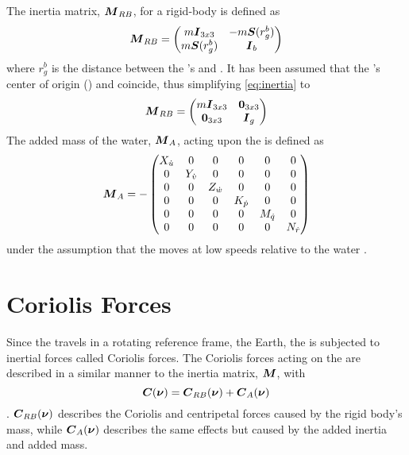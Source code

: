 The inertia matrix, $\boldsymbol{M}_{RB}$, for a rigid-body is defined as
\begin{equation}
\label{eq:inertia}
    \boldsymbol{M}_{RB} = 
    \begin{pmatrix}
    m\boldsymbol{I}_{3x3}       & -m\boldsymbol{S}(r^b_g) \\
    m\boldsymbol{S}(r^b_g) & \boldsymbol{I}_{b}
    \end{pmatrix}
\end{equation}
where $r^b_g$ is the distance between the \abbrROV's \abbrCO and \abbrCG \citep[p.52]{fossen2011}.
It has been assumed that the \abbrROV's center of origin (\abbrCO) and \abbrCG coincide, thus simplifying \eqref{eq:inertia} to
\begin{equation}
   \boldsymbol{M}_{RB} = 
    \begin{pmatrix}
        m\boldsymbol{I}_{3x3} & \boldsymbol{0}_{3x3} \\
        \boldsymbol{0}_{3x3} & \boldsymbol{I}_{g}
    \end{pmatrix}
\end{equation} 
The added mass of the water, $\boldsymbol{M}_A$, acting upon the \abbrROV is defined as
\begin{equation}
\boldsymbol{M}_A =
-\begin{pmatrix}
    X_{\dot{u}} & 0 & 0 & 0 & 0 & 0 \\
    0 & Y_{\dot{v}} & 0 & 0 & 0 & 0 \\
    0 & 0 & Z_{\dot{w}} & 0 & 0 & 0 \\
    0 & 0 & 0 & K_{\dot{p}}& 0 & 0 \\
    0 & 0 & 0 & 0 & M_{\dot{q}} & 0 \\
    0 & 0 & 0 & 0 & 0 & N_{\dot{r}} \\
    \end{pmatrix}
\end{equation}
under the assumption that the \abbrROV moves at low speeds relative to the water \citep[p.121]{fossen2011}.
\section{Coriolis Forces}
Since the \abbrROV travels in a rotating reference frame, the Earth, the \abbrROV is subjected to inertial forces called Coriolis forces. The Coriolis forces acting on the \abbrROV are described in a similar manner to the inertia matrix, $\boldsymbol{M}$, with
\begin{equation}
    \boldsymbol{C}(\boldsymbol{\nu}) = \boldsymbol{C}_{RB}(\boldsymbol{\nu}) + \boldsymbol{C}_A(\boldsymbol{\nu})
\end{equation}\citep[p.110]{fossen2011}. $\boldsymbol{C}_{RB}(\boldsymbol{\nu})$ describes the Coriolis and centripetal forces caused by the rigid body's mass, while $\boldsymbol{C}_A(\boldsymbol{\nu})$ describes the same effects but caused by the added inertia and added mass.

